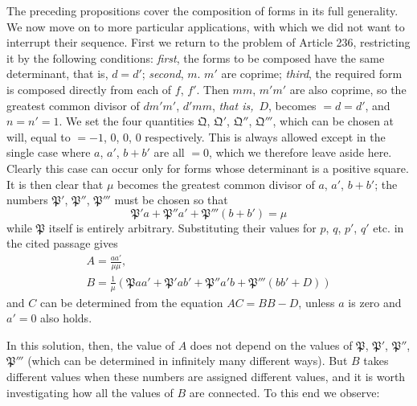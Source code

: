 The preceding propositions cover the composition of forms in its full generality. We now move on to more particular applications, with which we did not want to interrupt their sequence. First we return to the problem of Article 236, restricting it by the following conditions: \textit{first}, the forms to be composed have the same determinant, that is, $d=d'$; \textit{second}, $m$. $m'$ are coprime; \textit{third}, the required form is composed directly from each of $f$, $f'$. Then $mm$, $m'm'$ are also coprime, so the greatest common divisor of $dm'm'$, $d'mm$, \textit{that is,}\ $D$, becomes $=d=d'$, and $n=n'=1$. We set the four quantities $\mathfrak{Q}$, $\mathfrak{Q}'$, $\mathfrak{Q}''$, $\mathfrak{Q}'''$, which can be chosen at will, equal to $=-1$, $0$, $0$, $0$ respectively. This is always allowed except in the single case where $a$, $a'$, $b+b'$ are all $=0$, which we therefore leave aside here. Clearly this case can occur only for forms whose determinant is a positive square. It is then clear that $\mu$ becomes the greatest common divisor of $a$, $a'$, $b+b'$; the numbers $\mathfrak{P}'$, $\mathfrak{P}''$, $\mathfrak{P}'''$ must be chosen so that
\[
\mathfrak{P}'a+\mathfrak{P}''a'+\mathfrak{P}'''(b+b')=\mu
\]
while $\mathfrak{P}$ itself is entirely arbitrary. Substituting their values for $p$, $q$, $p'$, $q'$ etc. in the cited passage gives
\[
\begin{gathered}A=\frac{aa'}{\mu\mu},\\ B=\frac{1}{\mu}(\mathfrak{P}aa'+\mathfrak{P}'ab'+\mathfrak{P}''a'b+\mathfrak{P}'''(bb'+D))\end{gathered}
\]
and $C$ can be determined from the equation $AC=BB-D$, unless $a$ is zero and $a'=0$ also holds.

In this solution, then, the value of $A$ does not depend on the values of $\mathfrak{P}$, $\mathfrak{P}'$, $\mathfrak{P}''$, $\mathfrak{P}'''$ (which can be determined in infinitely many different ways). But $B$ takes different values when these numbers are assigned different values, and it is worth investigating how all the values of $B$ are connected. To this end we observe:

